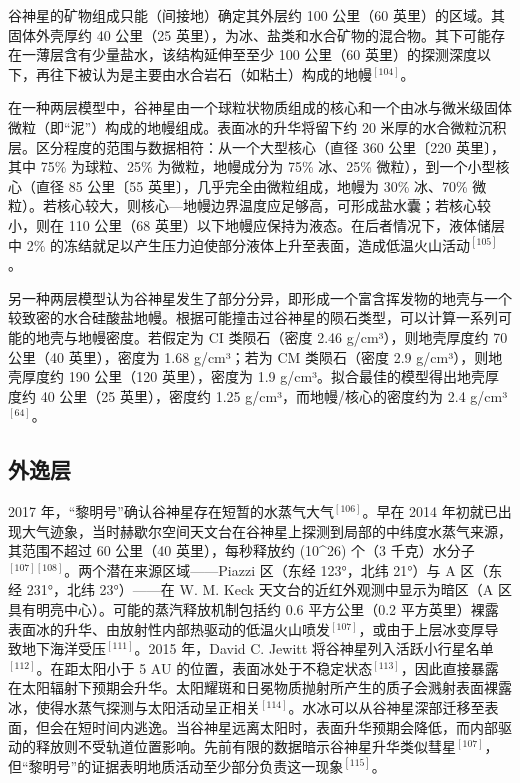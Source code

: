 谷神星的矿物组成只能（间接地）确定其外层约 100 公里（60 英里）的区域。其固体外壳厚约 40 公里（25 英里），为冰、盐类和水合矿物的混合物。其下可能存在一薄层含有少量盐水，该结构延伸至至少 100 公里（60 英里）的探测深度以下，再往下被认为是主要由水合岩石（如粘土）构成的地幔$^{[104]}$。

在一种两层模型中，谷神星由一个球粒状物质组成的核心和一个由冰与微米级固体微粒（即“泥”）构成的地幔组成。表面冰的升华将留下约 20 米厚的水合微粒沉积层。区分程度的范围与数据相符：从一个大型核心（直径 360 公里〔220 英里〕，其中 75\% 为球粒、25\% 为微粒，地幔成分为 75\% 冰、25\% 微粒），到一个小型核心（直径 85 公里〔55 英里〕，几乎完全由微粒组成，地幔为 30\% 冰、70\% 微粒）。若核心较大，则核心—地幔边界温度应足够高，可形成盐水囊；若核心较小，则在 110 公里（68 英里）以下地幔应保持为液态。在后者情况下，液体储层中 2\% 的冻结就足以产生压力迫使部分液体上升至表面，造成低温火山活动$^{[105]}$。

另一种两层模型认为谷神星发生了部分分异，即形成一个富含挥发物的地壳与一个较致密的水合硅酸盐地幔。根据可能撞击过谷神星的陨石类型，可以计算一系列可能的地壳与地幔密度。若假定为 CI 类陨石（密度 2.46 g/cm³），则地壳厚度约 70 公里（40 英里），密度为 1.68 g/cm³；若为 CM 类陨石（密度 2.9 g/cm³），则地壳厚度约 190 公里（120 英里），密度为 1.9 g/cm³。拟合最佳的模型得出地壳厚度约 40 公里（25 英里），密度约 1.25 g/cm³，而地幔/核心的密度约为 2.4 g/cm³$^{[64]}$。
\subsection{外逸层}
2017 年，“黎明号”确认谷神星存在短暂的水蒸气大气$^{[106]}$。早在 2014 年初就已出现大气迹象，当时赫歇尔空间天文台在谷神星上探测到局部的中纬度水蒸气来源，其范围不超过 60 公里（40 英里），每秒释放约 (10^{26}) 个（3 千克）水分子$^{[107][108]}$。两个潜在来源区域——Piazzi 区（东经 123°，北纬 21°）与 A 区（东经 231°，北纬 23°）——在 W. M. Keck 天文台的近红外观测中显示为暗区（A 区具有明亮中心）。可能的蒸汽释放机制包括约 0.6 平方公里（0.2 平方英里）裸露表面冰的升华、由放射性内部热驱动的低温火山喷发$^{[107]}$，或由于上层冰变厚导致地下海洋受压$^{[111]}$。2015 年，David C. Jewitt 将谷神星列入活跃小行星名单$^{[112]}$。在距太阳小于 5 AU 的位置，表面冰处于不稳定状态$^{[113]}$，因此直接暴露在太阳辐射下预期会升华。太阳耀斑和日冕物质抛射所产生的质子会溅射表面裸露冰，使得水蒸气探测与太阳活动呈正相关$^{[114]}$。水冰可以从谷神星深部迁移至表面，但会在短时间内逃逸。当谷神星远离太阳时，表面升华预期会降低，而内部驱动的释放则不受轨道位置影响。先前有限的数据暗示谷神星升华类似彗星$^{[107]}$，但“黎明号”的证据表明地质活动至少部分负责这一现象$^{[115]}$。

